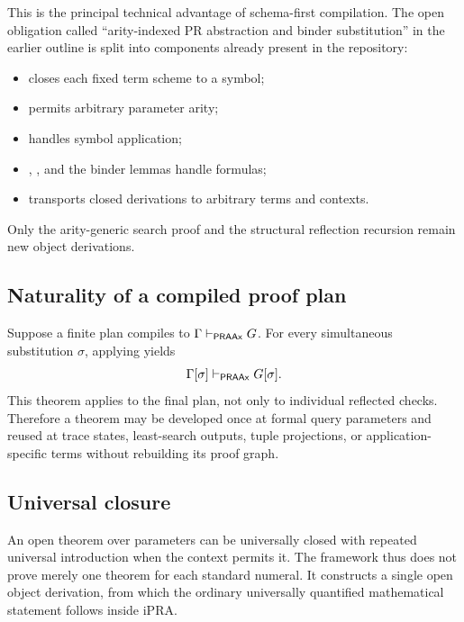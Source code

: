 This is the principal technical advantage of schema-first compilation.  The
open obligation called ``arity-indexed PR abstraction and binder substitution''
in the earlier outline is split into components already present in the
repository:

\begin{itemize}
\item {} closes each fixed term scheme to a symbol;
\item {} permits arbitrary parameter arity;
\item {} handles symbol application;
\item {}, , and the binder lemmas handle formulas;
\item {} transports closed derivations to arbitrary terms and
  contexts.
\end{itemize}

Only the arity-generic search proof and the structural reflection recursion
remain new object derivations.

\subsection{Naturality of a compiled proof plan}

Suppose a finite plan compiles to \(\Gamma\mathrel{\vdash_{\mathsf{PRAAx}}} G\).  For every
simultaneous substitution \(\sigma\), applying  yields
\[
  \Gamma[\sigma]\mathrel{\vdash_{\mathsf{PRAAx}}} G[\sigma].
\]
This theorem applies to the final plan, not only to individual reflected
checks.  Therefore a theorem may be developed once at formal query parameters
and reused at trace states, least-search outputs, tuple projections, or
application-specific terms without rebuilding its proof graph.

\subsection{Universal closure}

An open theorem over parameters can be universally closed with repeated
universal introduction when the context permits it.  The framework thus does
not prove merely one theorem for each standard numeral.  It constructs a
single open object derivation, from which the ordinary universally quantified
mathematical statement follows inside iPRA.
